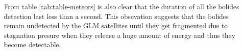 From table \ref{tab:table-meteors} is also clear that the duration of all the bolides detection last less than a second. This obsevation suggests that the bolides remain undetected by the GLM satellites until they get fragmented due to stagnation presure when they release a huge amount of energy and thus they become detectable.





